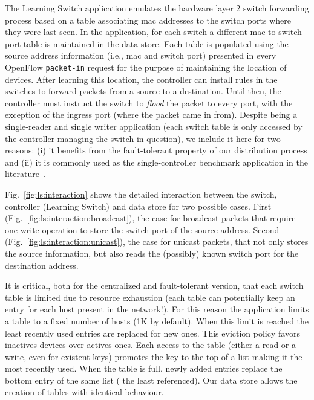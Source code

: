 The Learning Switch application emulates the hardware layer 2 switch forwarding process based on a table associating \gls{mac} addresses to the switch ports where they were last seen. 
In the application, for each switch  a different \gls{mac}-to-switch-port table is maintained in the data store. 
Each table is populated using the source address information (i.e., \gls{mac} and switch port)  presented in every OpenFlow \texttt{packet-in} request for the purpose of maintaining the location of devices. 
After learning this location, the controller can install rules in the switches to forward packets from a source to a destination. 
Until then, the controller must instruct the switch to \emph{flood} the packet to every port, with the exception of the ingress port (where the packet came in from).
Despite being a single-reader and single writer application (each switch table is only accessed by the controller managing the switch in question), we include it here for two reasons: (i) it benefits from the fault-tolerant property of our distribution process and (ii) it is commonly used as the single-controller benchmark application in the literature~\cite{Tootoonchian:2012uia,Erickson:2013er}. 

Fig.~\ref{fig:ls:interaction}  shows the detailed interaction between the switch, controller (Learning Switch) and data store for two possible cases. 
First (Fig.~\ref{fig:ls:interaction:broadcast}), the case for broadcast packets that require one write operation to store the switch-port  of the source address. 
Second (Fig.~\ref{fig:ls:interaction:unicast}),   the case for unicast packets, that not only stores the source information, but also reads the (possibly) known switch port  for the destination address.  


It is critical, both for the centralized and fault-tolerant version, that each switch table is limited due to resource exhaustion (each table can potentially keep an entry for each host present in the network!).
For this reason the application limits a table to a fixed number of hosts (1K by default).
When this limit is reached the least recently used entries are replaced for new ones.  
This eviction policy favors inactives devices over actives ones.
Each access to the table (either a read or a write, even for existent keys) promotes the key to the top of a list making it the most recently used.
When the table is full, newly added entries replace the bottom entry of the same list ( the least referenced). Our data store allows the creation of tables with identical behaviour. 

